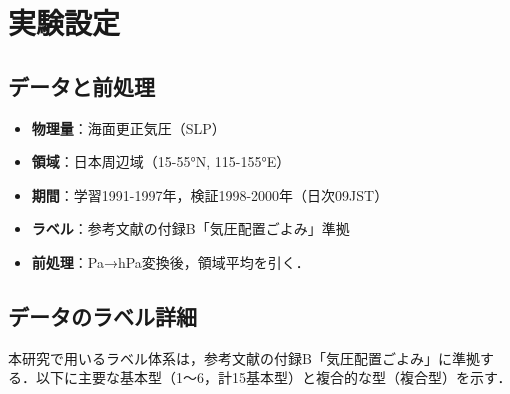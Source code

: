 \documentclass{jarticle}
\theoremstyle{definition}
\begin{document}
\section{実験設定}
\subsection{データと前処理}
\begin{itemize}
\item \textbf{物理量}：海面更正気圧（SLP）
\item \textbf{領域}：日本周辺域（15-55°N, 115-155°E）
\item \textbf{期間}：学習1991-1997年，検証1998-2000年（日次09JST）
\item \textbf{ラベル}：参考文献\cite{吉野2002日本の気候}の付録B「気圧配置ごよみ」準拠
\item \textbf{前処理}：Pa→hPa変換後，領域平均を引く．
\end{itemize}
\subsection{データのラベル詳細}
本研究で用いるラベル体系は，参考文献\cite{吉野2002日本の気候}の付録B「気圧配置ごよみ」に準拠する．以下に主要な基本型（1〜6，計15基本型）と複合的な型（複合型）を示す．
\end{document}
